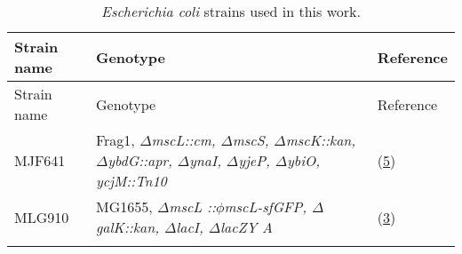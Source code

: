 \begin{longtable}[]{@{}lll@{}}
\caption{\emph{Escherichia
coli}
strains
used
in
this
work.}\tabularnewline
\toprule
\begin{minipage}[b]{0.16\columnwidth}\raggedright\strut
Strain
name\strut
\end{minipage}
&
\begin{minipage}[b]{0.63\columnwidth}\raggedright\strut
Genotype\strut
\end{minipage}
&
\begin{minipage}[b]{0.13\columnwidth}\raggedright\strut
Reference\strut
\end{minipage}\tabularnewline
\midrule
\endfirsthead
\toprule
\begin{minipage}[b]{0.16\columnwidth}\raggedright\strut
Strain
name\strut
\end{minipage}
&
\begin{minipage}[b]{0.63\columnwidth}\raggedright\strut
Genotype\strut
\end{minipage}
&
\begin{minipage}[b]{0.13\columnwidth}\raggedright\strut
Reference\strut
\end{minipage}\tabularnewline
\midrule
\endhead
\begin{minipage}[t]{0.16\columnwidth}\raggedright\strut
MJF641\strut
\end{minipage}
&
\begin{minipage}[t]{0.63\columnwidth}\raggedright\strut
Frag1,
\emph{\(\Delta\)mscL::cm,
\(\Delta\)mscS,
\(\Delta\)mscK::kan,
\(\Delta\)ybdG::apr,
\(\Delta\)ynaI,
\(\Delta\)yjeP,
\(\Delta\)ybiO,
ycjM::Tn10}\strut
\end{minipage}
&
\begin{minipage}[t]{0.13\columnwidth}\raggedright\strut
(\protect\hyperlink{ref-edwards2012}{5})\strut
\end{minipage}\tabularnewline
\begin{minipage}[t]{0.16\columnwidth}\raggedright\strut
MLG910\strut
\end{minipage}
&
\begin{minipage}[t]{0.63\columnwidth}\raggedright\strut
MG1655,
\emph{\(\Delta\)mscL
::\(\phi\)mscL-sfGFP,
\(\Delta\)galK::kan,
\(\Delta\)lacI,
\(\Delta\)lacZY
A}\strut
\end{minipage}
&
\begin{minipage}[t]{0.13\columnwidth}\raggedright\strut
(\protect\hyperlink{ref-bialecka-fornal2012}{3})\strut
\end{minipage}\tabularnewline
\begin{minipage}[t]{0.16\columnwidth}\raggedright\strut

\end{minipage}
\end{longtable}
